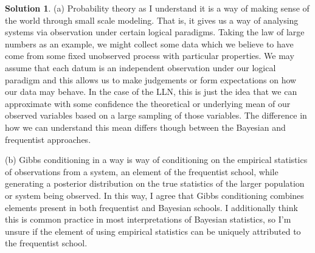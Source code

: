\documentclass[12pt]{article}
\theoremstyle{definition}
\newtheorem{sol}{Solution}
\theoremstyle{remark}
\begin{document}
\begin{sol}
    (a) Probability theory as I understand it is a way of making sense of the world through small scale modeling. That is, it gives us a way of analysing systems via observation under certain logical paradigms. Taking the law of large numbers as an example, we might collect some data which we believe to have come from some fixed unobserved process with particular properties. We may assume that each datum is an independent observation under our logical paradigm and this allows us to make judgements or form expectations on how our data may behave. In the case of the LLN, this is just the idea that we can approximate with some confidence the theoretical or underlying mean of our observed variables based on a large sampling of those variables. The difference in how we can understand this mean differs though between the Bayesian and frequentist approaches.

    (b) Gibbs conditioning in a way is way of conditioning on the empirical statistics of observations from a system, an element of the frequentist school, while generating a posterior distribution on the true statistics of the larger population or system being observed. In this way, I agree that Gibbs conditioning combines elements present in both frequentist and Bayesian schools. I additionally think this is common practice in most interpretations of Bayesian statistics, so I'm unsure if the element of using empirical statistics can be uniquely attributed to the frequentist school.

\end{sol}

\newpage
\end{document}
